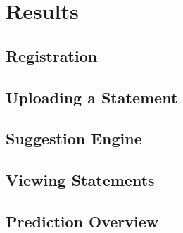 \chapter{Results}

\begin{comment}
Chapter 5: Results
Results that illustrate how the system designed by you works in practice, and how it is intended to be used, may be presented in this chapter. Screen shots may be useful to illustrate how the software interacts with the user.
\end{comment}


\section{Registration}

\section{Uploading a Statement}

\section{Suggestion Engine}

\section{Viewing Statements}

\section{Prediction Overview}